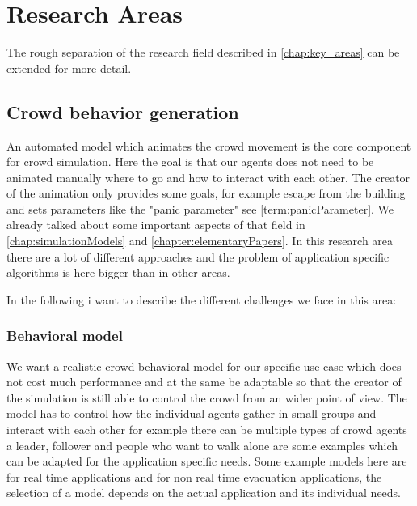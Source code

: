 \documentclass{acmsiggraph}               %
\begin{document}
\section{Research Areas}

The rough separation of the research field described in \ref{chap:key_areas} can be extended for more detail. \cite{thalmann_crowd_2013}

\subsection{Crowd behavior generation}

An automated model which animates the crowd movement is the core component for crowd simulation. Here the goal is that our agents does not need to be animated manually where to go and how to interact with each other. The creator of the animation only provides some goals, for example escape from the building and sets parameters like the "panic parameter" see \ref{term:panicParameter}. We already talked about some important aspects of that field in \ref{chap:simulationModels} and \ref{chapter:elementaryPapers}.  In this research area there are a lot of different approaches and the problem of application specific algorithms is here bigger than in other areas.

In the following i want to describe the different challenges we face in this area:


\subsubsection{Behavioral model}
We want a realistic crowd behavioral model for our specific use case which does not cost much performance and at the same be adaptable so that the creator of the simulation is still able to control the crowd from an wider point of view. The model has to control how the individual agents gather in small groups and interact with each other for example there can be multiple types of crowd agents a leader, follower and people who want to walk alone are some examples which can be adapted for the application specific needs. Some example models here are \cite{musse_hierarchical_2001} for real time applications and \cite{braun_simulating_2005} for non real time evacuation applications, the selection of a model depends on the actual application and its individual needs.
\end{document}
